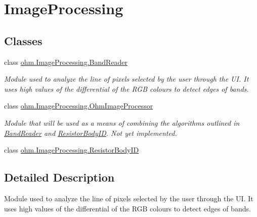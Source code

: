 \hypertarget{group___image_processing}{}\section{Image\+Processing}
\label{group___image_processing}
\subsection*{Classes}
\begin{DoxyCompactItemize}
\item 
class \hyperlink{classohm_1_1_image_processing_1_1_band_reader}{ohm.\+Image\+Processing.\+Band\+Reader}
\begin{DoxyCompactList}\small\item\em Module used to analyze the line of pixels selected by the user through the UI. It uses high values of the differential of the R\+GB colours to detect edges of bands. \end{DoxyCompactList}\item 
class \hyperlink{classohm_1_1_image_processing_1_1_ohm_image_processor}{ohm.\+Image\+Processing.\+Ohm\+Image\+Processor}
\begin{DoxyCompactList}\small\item\em Module that will be used as a means of combining the algorithms outlined in \hyperlink{classohm_1_1_image_processing_1_1_band_reader}{Band\+Reader} and \hyperlink{classohm_1_1_image_processing_1_1_resistor_body_i_d}{Resistor\+Body\+ID}. Not yet implemented. \end{DoxyCompactList}\item 
class \hyperlink{classohm_1_1_image_processing_1_1_resistor_body_i_d}{ohm.\+Image\+Processing.\+Resistor\+Body\+ID}
\end{DoxyCompactItemize}


\subsection{Detailed Description}
Module used to analyze the line of pixels selected by the user through the UI. It uses high values of the differential of the R\+GB colours to detect edges of bands. 